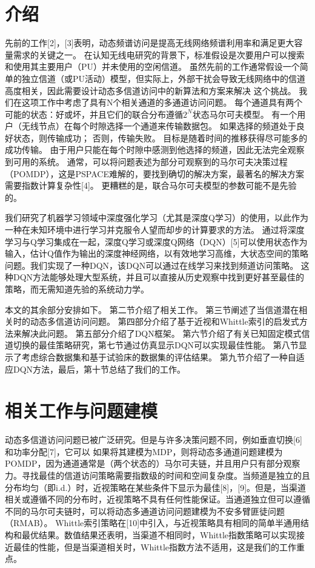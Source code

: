 \section{ 介绍 }
先前的工作[2]，[3]表明，动态频谱访问是提高无线网络频谱利用率和满足更大容量需求的关键之一。 在认知无线电研究的背景下，标准假设是次要用户可以搜索和使用其主要用户（PU）并未使用的空闲信道。 虽然先前的工作通常假设一个简单的独立信道（或PU活动）模型，但实际上，外部干扰会导致无线网络中的信道高度相关，因此需要设计动态多信道访问中的新算法和方案来解决 这个挑战。
我们在这项工作中考虑了具有N个相关通道的多通道访问问题。 每个通道具有两个可能的状态：好或坏，并且它们的联合分布遵循$2^{N}$状态马尔可夫模型。 有一个用户（无线节点）在每个时隙选择一个通道来传输数据包。 如果选择的频道处于良好状态，则传输成功； 否则，传输失败。 目标是随着时间的推移获得尽可能多的成功传输。 由于用户只能在每个时隙中感测到他选择的频道，因此无法完全观察到可用的系统。 通常，可以将问题表述为部分可观察到的马尔可夫决策过程（POMDP），这是PSPACE难解的，要找到确切的解决方案，最著名的解决方案需要指数计算复杂性[4]。 更糟糕的是，联合马尔可夫模型的参数可能不是先验的。

我们研究了机器学习领域中深度强化学习（尤其是深度Q学习）的使用，以此作为一种在未知环境中进行学习并克服令人望而却步的计算要求的方法。 通过将深度学习与Q学习集成在一起，深度Q学习或深度Q网络（DQN）[5]可以使用状态作为输入，估计Q值作为输出的深度神经网络，以有效地学习高维，大状态空间的策略 问题。我们实现了一种DQN，该DQN可以通过在线学习来找到频道访问策略。 这种DQN方法能够处理大型系统，并且可以直接从历史观察中找到更好甚至最佳的策略，而无需知道先验的系统动力学。

本文的其余部分安排如下。 第二节介绍了相关工作。 第三节阐述了当信道潜在相关时的动态多信道访问问题。 第四部分介绍了基于近视和Whittle索引的启发式方法来解决此问题。 第五部分介绍了DQN框架。 第六节介绍了有关已知固定模式信道切换的最佳策略研究，第七节通过仿真显示DQN可以实现最佳性能。 第八节显示了考虑综合数据集和基于试验床的数据集的评估结果。 第九节介绍了一种自适应DQN方法，最后，第十节总结了我们的工作。

\section{  相关工作与问题建模  }
动态多信道访问问题已被广泛研究。但是与许多决策问题不同，例如垂直切换[6]和功率分配[7]，它可以
如果将其建模为MDP，则将动态多通道问题建模为POMDP，因为通道通常是（两个状态的）马尔可夫链，并且用户只有部分观察力。寻找最佳的信道访问策略需要指数级的时间和空间复杂度。当频道是独立的且分布均匀（即i.d.）时，近视策略在某些条件下显示为最佳[8]，[9]。但是，当渠道相关或遵循不同的分布时，近视策略不具有任何性能保证。当通道独立但可以遵循不同的马尔可夫链时，可以将动态多通道访问问题建模为不安多臂匪徒问题（RMAB）。 Whittle索引策略在[10]中引入，与近视策略具有相同的简单半通用结构和最优结果。数值结果还表明，当渠道不相同时，Whittle指数策略可以实现接近最佳的性能，但是当渠道相关时，Whittle指数方法不适用，这是我们的工作重点。

